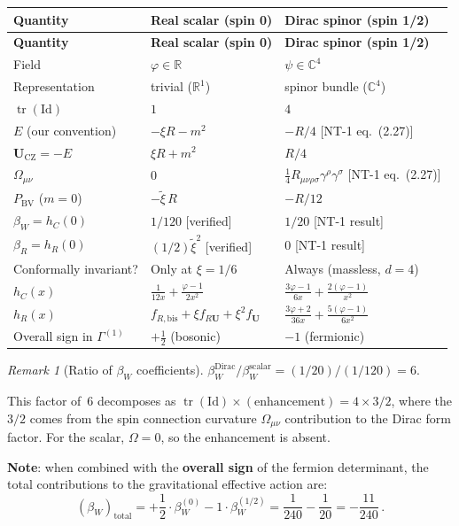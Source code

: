 \documentclass[12pt,a4paper]{article}
\theoremstyle{definition}
\theoremstyle{remark}
\newtheorem{remark}[proposition]{Remark}
\newcommand{\tr}{\operatorname{tr}}
\newcommand{\Id}{\mathrm{Id}}
\newcommand{\fromlit}[1]{\textcolor{blue!70!black}{\textsf{[#1]}}}
\newcommand{\verified}{\textcolor{green!50!black}{\textsf{[verified]}}}
\begin{document}
\begin{center}
\renewcommand{\arraystretch}{1.5}
\begin{longtable}{>{\raggedright}p{4cm} p{4.5cm} p{4.5cm}}
\toprule
\textbf{Quantity} &
\textbf{Real scalar (spin 0)} &
\textbf{Dirac spinor (spin 1/2)} \\
\midrule
\endfirsthead
\toprule
\textbf{Quantity} &
\textbf{Real scalar (spin 0)} &
\textbf{Dirac spinor (spin 1/2)} \\
\midrule
\endhead
Field &
$\varphi \in \mathbb{R}$ &
$\psi \in \mathbb{C}^4$ \\
Representation &
trivial ($\mathbb{R}^1$) &
spinor bundle ($\mathbb{C}^4$) \\
$\tr(\Id)$ &
$1$ &
$4$ \\
$E$ (our convention) &
$-\xi R - m^2$ &
$-R/4$ \fromlit{NT-1 eq.~(2.27)} \\
$\mathbf{U}_{\mathrm{CZ}} = -E$ &
$\xi R + m^2$ &
$R/4$ \\
$\Omega_{\mu\nu}$ &
$0$ &
$\frac{1}{4}R_{\mu\nu\rho\sigma}\gamma^\rho\gamma^\sigma$
  \fromlit{NT-1 eq.~(2.27)} \\
$P_{\mathrm{BV}}$ ($m=0$) &
$-\tilde{\xi}\,R$ &
$-R/12$ \\
\midrule
$\beta_W = h_C(0)$ &
$1/120$ \verified &
$1/20$ \fromlit{NT-1 result} \\
$\beta_R = h_R(0)$ &
$(1/2)\tilde{\xi}^2$ \verified &
$0$ \fromlit{NT-1 result} \\
Conformally invariant? &
Only at $\xi = 1/6$ &
Always (massless, $d=4$) \\
\midrule
$h_C(x)$ &
$\frac{1}{12x} + \frac{\varphi-1}{2x^2}$ &
$\frac{3\varphi-1}{6x} + \frac{2(\varphi-1)}{x^2}$ \\[4pt]
$h_R(x)$ &
$f_{R,\mathrm{bis}} + \xi f_{R\mathbf{U}} + \xi^2 f_{\mathbf{U}}$
  &
$\frac{3\varphi+2}{36x} + \frac{5(\varphi-1)}{6x^2}$ \\
\midrule
Overall sign in $\Gamma^{(1)}$ &
$+\frac{1}{2}$ (bosonic) &
$-1$ (fermionic) \\
\bottomrule
\end{longtable}
\end{center}

\begin{remark}[Ratio of $\beta_W$ coefficients]
\label{rem:betaW-ratio}
$\beta_W^{\mathrm{Dirac}} / \beta_W^{\mathrm{scalar}}
= (1/20)/(1/120) = 6$.

This factor of~$6$ decomposes as $\tr(\Id) \times (\text{enhancement})
= 4 \times 3/2$, where the $3/2$ comes from the spin connection
curvature $\Omega_{\mu\nu}$ contribution to the Dirac form factor.
For the scalar, $\Omega = 0$, so the enhancement is absent.

\textbf{Note}: when combined with the \textbf{overall sign} of the
fermion determinant, the total contributions to the gravitational
effective action are:
\begin{equation}
  (\beta_W)_{\mathrm{total}} = +\frac{1}{2}\cdot\beta_W^{(0)}
  - 1\cdot\beta_W^{(1/2)} = \frac{1}{240} - \frac{1}{20}
  = -\frac{11}{240}\,.
  \label{eq:betaW-total}
\end{equation}
\end{remark}
\end{document}
